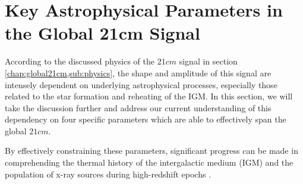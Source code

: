 \documentclass[12pt, TexShade, letterpaper]{report}
\begin{document}
\section{Key Astrophysical Parameters in the Global 21cm Signal}
According to the discussed physics of the $21cm$ signal in section \ref{chap:global21cm,sub:physics}, the shape and amplitude of this signal are intensely dependent on underlying astrophysical processes, especially those related to the star formation and reheating of the IGM. In this section, we will take the discussion further and address our current understanding of this dependency on four specific parameters which are able to effectively span the global $21cm$.\par
By effectively constraining these parameters, significant progress can be made in comprehending the thermal history of the intergalactic medium (IGM) and the population of x-ray sources during high-redshift epochs \cite{21century}.\par
\end{document}
